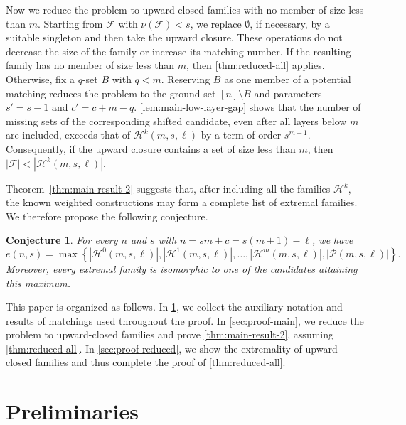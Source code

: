 \documentclass[10pt,a4paper]{article}
\numberwithin{equation}{section}
\newtheorem{conjecture}[conjecture]{Conjecture}
\theoremstyle{definition}
\newcommand{\F}{\mathcal F}
\begin{document}
Now we reduce the problem to upward closed families with no member of size less than $m$.
Starting from $\F$ with $\nu(\F)<s$, we replace $\emptyset$, if necessary, by a suitable singleton and then take the upward closure.
These operations do not decrease the size of the family or increase its matching number.
If the resulting family has no member of size less than $m$, then \cref{thm:reduced-all} applies.
Otherwise, fix a $q$-set $B$ with $q<m$.
Reserving $B$ as one member of a potential matching reduces the problem to the ground set $[n]\setminus B$ and parameters $s'=s-1$ and $c'=c+m-q$.
\cref{lem:main-low-layer-gap} shows that the number of missing sets of the corresponding shifted candidate, even after all layers below $m$ are included, exceeds that of $\mathcal H^k(m,s,\ell)$ by a term of order $s^{m-1}$.
Consequently, if the upward closure contains a set of size less than $m$, then $|\F|<|\mathcal H^k(m,s,\ell)|$.



Theorem~\ref{thm:main-result-2} suggests that, after including all the families $\mathcal H^k$, the known weighted constructions may form a complete list of extremal families.
We therefore propose the following conjecture.

\begin{conjecture}\label{conj:complete-classification}
        For every $n$ and $s$ with $n=sm+c=s(m+1)-\ell$, we have
        \[
                e(n,s)=\max\left\{|\mathcal H^0(m,s,\ell)|, |\mathcal H^1(m,s,\ell)|,\ldots,|\mathcal H^m(m,s,\ell)|,|\mathcal P(m,s,\ell)|\right\}.
        \]
        Moreover, every extremal family is isomorphic to one of the
        candidates attaining this maximum.
\end{conjecture}


This paper is organized as follows.
In \cref{sec:prelim}, we collect the auxiliary notation and results of matchings used throughout the proof.
In \cref{sec:proof-main}, we reduce the problem to upward-closed families and prove \cref{thm:main-result-2}, assuming \cref{thm:reduced-all}.
In \cref{sec:proof-reduced}, we show the extremality of upward closed families and thus complete the proof of \cref{thm:reduced-all}.




\section{Preliminaries}\label{sec:prelim}
\end{document}
